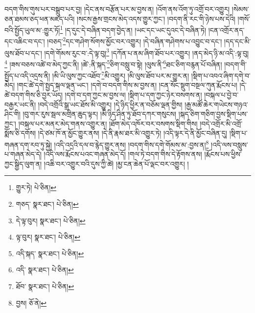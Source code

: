 བདག་གིས་གུས་པར་བསྒྲུབ་པར་བྱ། །དེང་ནས་བརྩོན་པར་མ་བྱས་ན། །འོག་ནས་འོག་ཏུ་འགྲོ་བར་འགྱུར། །སེམས་ཅན་ཐམས་ཅད་ཕན་མཛད་པའི། །སངས་རྒྱས་གྲངས་མེད་འདས་གྱུར་ཀྱང་། །བདག་ནི་རང་གི་ཉེས་པས་དེའི། །གསོ་བའི་སྤྱོད་ཡུལ་མ་:གྱུར་ཏོ།\footnote{གྱུར་ཏེ།  པེ་ཅིན། } །ད་དུང་དེ་བཞིན་བདག་བྱེད་ན། །ཡང་དང་ཡང་དུའང་དེ་བཞིན་ཏེ། །ངན་འགྲོར་ནད་དང་འཆིང་བ་དང་། །བཅད་\footnote{གཅད་  སྣར་ཐང་།  པེ་ཅིན། }དང་གཤེག་སོགས་མྱོང་བར་འགྱུར། །དེ་བཞིན་གཤེགས་པ་འབྱུང་བ་དང་། །དད་དང་མི་ལུས་ཐོབ་པ་དང་། །དགེ་གོམས་རུང་བ་:དེ་ལྟ་བུ།\footnote{དེ་ལྟ་བུར།  སྣར་ཐང་།  པེ་ཅིན། } །དཀོན་པ་ནམ་ཞིག་ཐོབ་པར་འགྱུར། །ནད་མེད་ཉི་མ་འདི་:ལྟ་བུ།\footnote{ལྟ་བུར།  སྣར་ཐང་།  པེ་ཅིན། } །ཟས་བཅས་འཚེ་བ་མེད་ཀྱང་ནི། །ཚེ་:ནི་སྐད་\footnote{འདི་སྐད་  སྣར་ཐང་།  པེ་ཅིན། }ཅིག་བསླུ་བ་སྟེ། །ལུས་ནི་\footnote{འདི་  སྣར་ཐང་།  པེ་ཅིན། }ཐང་ཅིག་བརྙན་པོ་བཞིན། །བདག་གི་སྤྱོད་པ་འདི་འདྲས་ནི། །མི་ཡི་ལུས་ཀྱང་འཐོབ་\footnote{ཐོབ་  སྣར་ཐང་།  པེ་ཅིན། }མི་འགྱུར། །མི་ལུས་ཐོབ་པར་མ་གྱུར་ན། །སྡིག་པ་འབའ་ཞིག་དགེ་བ་མེད། །གང་ཚེ་དགེ་སྤྱད་སྐལ་ལྡན་ཡང་། །དགེ་བ་བདག་གིས་མ་བྱས་ན། །ངན་སོང་སྡུག་བསྔལ་ཀུན་རྨོངས་པ། །དེ་ཚེ་བདག་གིས་ཅི་བྱར་ཡོད། །དགེ་བ་དག་ཀྱང་མ་བྱས་ལ། །སྡིག་པ་དག་ཀྱང་ཉེར་བསགས་ན། །བསྐལ་པ་བྱེ་བ་བརྒྱར་ཡང་ནི། །བདེ་འགྲོའི་སྒྲ་ཡང་ཐོས་མི་འགྱུར། །དེ་ཉིད་ཕྱིར་ན་བཅོམ་ལྡན་གྱིས། །རྒྱ་མཚོ་ཆེར་གཡེངས་གཉའ་ཤིང་གི། །བུ་གར་རུས་སྦལ་མགྲིན་ཆུད་ལྟར། །མི་ཉིད་ཤིན་ཏུ་ཐོབ་དཀར་གསུངས། །སྐད་ཅིག་གཅིག་བྱས་སྡིག་པས་ཀྱང་། །བསྐལ་པར་མནར་མེད་གནས་འགྱུར་ན། །ཐོག་མེད་འཁོར་བར་བསགས་སྡིག་གིས། །བདེ་འགྲོར་མི་འགྲོ་སྨོས་ཅི་དགོས། །དེ་ཙམ་ཁོ་ན་མྱོང་གྱུར་ནས། །དེ་ནི་རྣམ་ཐར་མི་འགྱུར་ཏེ། །འདི་ལྟར་དེ་ནི་མྱོང་བཞིན་དུ། །སྡིག་པ་གཞན་དག་རབ་ཏུ་སྐྱེ། །འདི་འདྲའི་དལ་བ་རྙེད་གྱུར་ནས། །བདག་གིས་དགེ་གོམས་མ་:བྱས་ན།\footnote{བྱས།  ཅོ་ནེ། } །འདི་ལས་བསླུས་པ་གཞན་མེད་དེ། །འདི་ལས་རྨོངས་པའང་གཞན་མེད་དོ། །གལ་ཏེ་བདག་གིས་དེ་རྟོགས་ནས། །རྨོངས་པས་ཕྱིས་ཀྱང་སྒྱིད་ལུག་ན། །འཆི་བར་འགྱུར་བའི་དུས་ཀྱི་ཚེ། །མྱ་ངན་ཆེན་པོ་ལྡང་བར་འགྱུར། །
